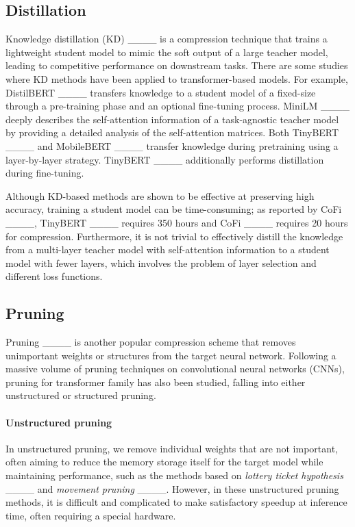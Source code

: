 \subsection{Distillation}
Knowledge distillation (KD) ____ is a compression technique that trains a lightweight student model to mimic the soft output of a large teacher model, leading to competitive performance on downstream tasks. There are some studies where KD methods have been applied to transformer-based models. For example, DistilBERT ____ transfers knowledge to a student model of a fixed-size through a pre-training phase and an optional fine-tuning process. MiniLM ____ deeply describes the self-attention information of a task-agnostic teacher model by providing a detailed analysis of the self-attention matrices. Both TinyBERT ____ and MobileBERT ____ transfer knowledge during pretraining using a layer-by-layer strategy. TinyBERT ____ additionally performs distillation during fine-tuning. 

Although KD-based methods are shown to be effective at preserving high accuracy, training a student model can be time-consuming; as reported by CoFi ____, TinyBERT ____ requires 350 hours and CoFi ____ requires 20 hours for compression. Furthermore, 
it is not trivial to effectively distill the knowledge from a multi-layer teacher model with self-attention information to a student model with fewer layers, which involves the problem of layer selection and different loss functions.


\subsection{Pruning}
Pruning ____ is another popular compression scheme that removes unimportant weights or structures from the target neural network. Following a massive volume of pruning techniques on convolutional neural networks (CNNs), pruning for transformer family has also been studied, falling into either unstructured or structured pruning.

\paragraph{Unstructured pruning} 
In unstructured pruning, we remove individual weights that are not important, often aiming to reduce the memory storage itself for the target model while maintaining performance, such as the methods based on \textit{lottery ticket hypothesis} ____ and \textit{movement pruning} ____. However, in these unstructured pruning methods, it is difficult and complicated to make satisfactory speedup at inference time, often requiring a special hardware.

